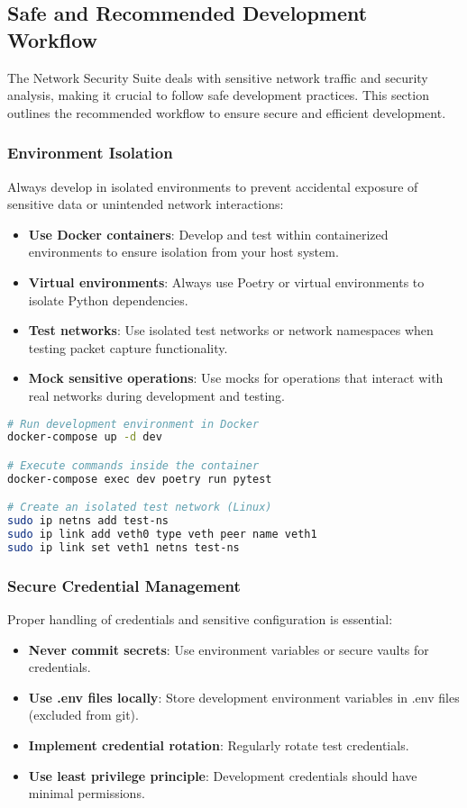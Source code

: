 \subsection{Safe and Recommended Development Workflow}
The Network Security Suite deals with sensitive network traffic and security analysis, making it crucial to follow safe development practices. This section outlines the recommended workflow to ensure secure and efficient development.

\subsubsection{Environment Isolation}
Always develop in isolated environments to prevent accidental exposure of sensitive data or unintended network interactions:

\begin{itemize}
    \item \textbf{Use Docker containers}: Develop and test within containerized environments to ensure isolation from your host system.
    \item \textbf{Virtual environments}: Always use Poetry or virtual environments to isolate Python dependencies.
    \item \textbf{Test networks}: Use isolated test networks or network namespaces when testing packet capture functionality.
    \item \textbf{Mock sensitive operations}: Use mocks for operations that interact with real networks during development and testing.
\end{itemize}

\begin{lstlisting}[language=bash, caption=Environment Isolation Example]
# Run development environment in Docker
docker-compose up -d dev

# Execute commands inside the container
docker-compose exec dev poetry run pytest

# Create an isolated test network (Linux)
sudo ip netns add test-ns
sudo ip link add veth0 type veth peer name veth1
sudo ip link set veth1 netns test-ns
\end{lstlisting}

\subsubsection{Secure Credential Management}
Proper handling of credentials and sensitive configuration is essential:

\begin{itemize}
    \item \textbf{Never commit secrets}: Use environment variables or secure vaults for credentials.
    \item \textbf{Use .env files locally}: Store development environment variables in .env files (excluded from git).
    \item \textbf{Implement credential rotation}: Regularly rotate test credentials.
    \item \textbf{Use least privilege principle}: Development credentials should have minimal permissions.
\end{itemize}

